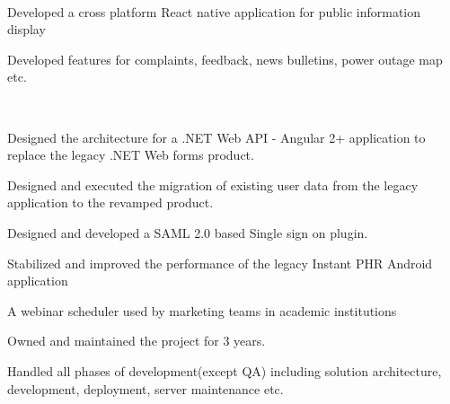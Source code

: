 \documentclass[]{deedy-resume-openfont}
\begin{document}
\begin{minipage}[t]{0.66\textwidth}


\\
\begin{tightemize}
    \item Developed a cross platform React native application for public information display
    \item Developed features for complaints, feedback, news bulletins, power outage map etc.
\end{tightemize}
\sectionsep


\\
\begin{tightemize} 
    \item Designed the architecture for a .NET Web API - Angular 2+ application to replace the legacy .NET Web forms product.
    \item Designed and executed the migration of existing user data from the legacy application to the revamped product.
    \item Designed and developed a SAML 2.0 based Single sign on plugin.
    \item Stabilized and improved the performance of the legacy Instant PHR Android application
\end{tightemize}
\sectionsep

\begin{tightemize}
    \item A webinar scheduler used by marketing teams in academic institutions
    \item Owned and maintained the project for 3 years.
    \item Handled all phases of development(except QA) including solution architecture, development, deployment, server maintenance etc.
\end{tightemize}
\sectionsep



\end{minipage}
\end{document}
